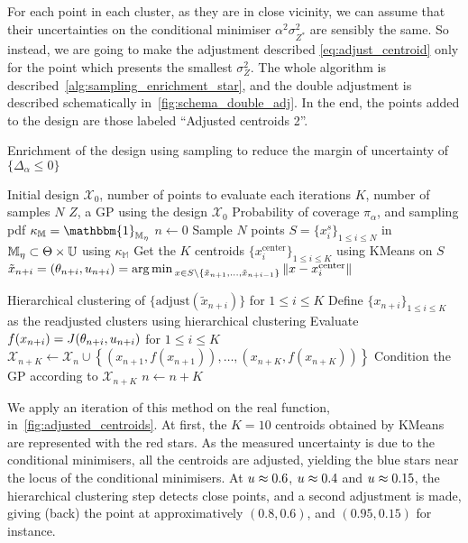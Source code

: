 \documentclass[../../Main_ManuscritThese.tex]{subfiles}
\begin{document}
For each point in each cluster, as they are in close vicinity, we can
assume that their uncertainties on the conditional minimiser
$\alpha^2\sigma^2_{Z^*}$ are sensibly the same. So instead, we are
going to make the adjustment described \cref{eq:adjust_centroid} only
for the point which presents the smallest $\sigma^2_Z$.  The whole
algorithm is described~\cref{alg:sampling_enrichment_star}, and the
double adjustment is described schematically
in~\cref{fig:schema_double_adj}. In the end, the points added to the
design are those labeled ``Adjusted centroids 2''.



\begin{algorithm}
  \caption{Enrichment of the design using sampling to reduce the margin of uncertainty of $\{\Delta_{\alpha}\leq 0\}$}
  \label{alg:sampling_enrichment_star}
\begin{algorithmic}
  \REQUIRE Initial design $\mathcal{X}_0$, 
  \REQUIRE number of points to evaluate each iterations $K$, number of samples $N$
  \REQUIRE $Z$, a GP using the design $\mathcal{X}_0$
  \REQUIRE Probability of coverage $\pi_{\alpha}$, and sampling pdf $\kappa_{\mathbb{M}} = \mathbbm{1}_{\mathbb{M}_{\eta}}$
\STATE $n \leftarrow 0$
\STATE Sample $N$ points $S = \{x^s_i\}_{1 \leq i \leq N}$ in $\mathbb{M}_{\eta}\subset \Theta \times \mathbb{U}$ using $\kappa_{\mathbb{M}}$
\STATE Get the $K$ centroids $\{x_i^{\mathrm{center}}\}_{1 \leq i \leq K}$ using KMeans on $S$
\STATE $\tilde{x}_{n+i}=(\theta_{n+i},u_{n+i})=\operatorname*{arg\,min \,}_{x \in S \setminus \{\tilde{x}_{n+1}, \dots, \tilde{x}_{n+i-1}\}} \|x - x_i^{\mathrm{center}} \|$
\ENDFOR

\STATE Hierarchical clustering of $\{\mathrm{adjust}(\tilde{x}_{n+i})\}$ for $1 \leq i \leq K$
\STATE Define $\{x_{n+i}\}_{1\leq i\leq K}$ as the readjusted clusters using hierarchical clustering
\STATE Evaluate $f(x_{n+i})=J(\theta_{n+i},u_{n+i})$ for $1\leq i \leq K$
\STATE $\mathcal{X}_{n+K} \leftarrow \mathcal{X}_n \cup \left\{\left(x_{n+1}, f(x_{n+1})\right),\dots,  \left(x_{n+K}, f(x_{n+K})\right)\right\}$
\STATE Condition the GP according to $\mathcal{X}_{n+K}$
\STATE $n \leftarrow n + K$
\ENDWHILE
\end{algorithmic}
\end{algorithm}

We apply an iteration of this method on the real function,
in~\cref{fig:adjusted_centroids}. At first, the $K=10$ centroids
obtained by KMeans are represented with the red stars. As the measured
uncertainty is due to the conditional minimisers, all the centroids
are adjusted, yielding the blue stars near the locus of the
conditional minimisers. At $u \approx \num{0.6}$,
$u\approx\num{0.4}$ and $u\approx \num{0.15}$, the hierarchical
clustering step detects close points, and a second adjustment is made,
giving (back) the point at approximatively $(0.8, 0.6)$, and
$(0.95, 0.15)$ for instance.
\end{document}
